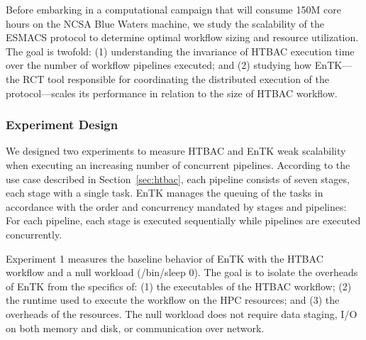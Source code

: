 
Before embarking in a computational campaign that will consume 150M core
hours on the NCSA Blue Waters machine, we study the scalability of the ESMACS
protocol to determine optimal workflow sizing and resource utilization. The
goal is twofold: (1) understanding the invariance of HTBAC execution time
over the number of workflow pipelines executed; and (2) studying how
EnTK---the RCT tool responsible for coordinating the distributed execution of
the protocol---scales its performance in relation to the size of HTBAC
workflow.

\subsubsection{Experiment Design}\label{ssec:exp_design}

We designed two experiments to measure HTBAC and EnTK weak scalability when
executing an increasing number of concurrent pipelines. According to the use
case described in Section~\ref{sec:htbac}, each pipeline consists of seven
stages, each stage with a single task. EnTK manages the queuing of the tasks
in accordance with the order and concurrency mandated by stages and
pipelines: For each pipeline, each stage is executed sequentially while
pipelines are executed concurrently.


Experiment 1 measures the baseline behavior of EnTK with the HTBAC workflow
and a null workload (\textmd{/bin/sleep 0}). The goal is to isolate the
overheads of EnTK from the specifics of: (1) the executables of the HTBAC
workflow; (2) the runtime used to execute the workflow on the HPC resources;
and (3) the overheads of the resources. The null workload does not require
data staging, I/O on both memory and disk, or communication over network.

